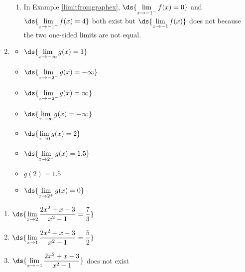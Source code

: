 \documentclass{ximera}
\begin{document}
\begin{enumerate}
\begin{enumerate}
\item  In Example \ref{limitfromgraphex},  $\ds{\lim_{x \rightarrow -1^{-}} f(x)  = 0}$ and $\ds{\lim_{x \rightarrow -1^{+}} f(x) = 4}$ both exist but $\ds{\lim_{x \rightarrow -1} f(x)}$ does not because the two one-sided limits are not equal.

\end{enumerate}

\item  \begin{multicols}{4} \begin{itemize} \item $\ds{\lim_{x \rightarrow -\infty} g(x) = 1}$

\item $\ds{\lim_{x \rightarrow -2^{-}} g(x) = -\infty}$

\item $\ds{\lim_{x \rightarrow -2^{+}} g(x) = \infty}$

\item  $\ds{\lim_{x \rightarrow \infty} g(x) = -\infty}$

\end{itemize}

\end{multicols}

\bigskip

\begin{multicols}{4}

\begin{itemize}

\item $\ds{\lim_{x \rightarrow 0} g(x) = 2}$

\item $\ds{\lim_{x \rightarrow 2^{-}} g(x) = 1.5}$

\item  $g(2) = 1.5$

\item $\ds{\lim_{x \rightarrow 2^{+}} g(x) = 0}$
\end{itemize}

\end{multicols}

\bigskip

\setcounter{HW}{\value{enumi}}
\end{enumerate}
 


\begin{enumerate}
\setcounter{enumi}{\value{HW}}

\item  $\ds{\lim_{x \rightarrow 2} \dfrac{2x^2+x-3}{x^2-1} = \frac{7}{3}}$

\medskip
  
\item  $\ds{\lim_{x \rightarrow 1} \dfrac{2x^2+x-3}{x^2-1} = \frac{5}{2}}$

\medskip

\item   $\ds{\lim_{x \rightarrow -1} \dfrac{2x^2+x-3}{x^2-1}}$ does not exist

\medskip

\setcounter{HW}{\value{enumi}}
\end{enumerate}
\end{document}
